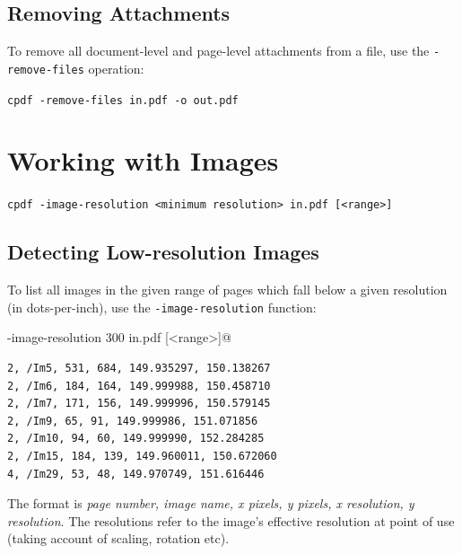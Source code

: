 \documentclass[a4paper,makeidx]{memoir}
\begin{document}
  \section{Removing Attachments}
   To remove all document-level and page-level attachments from a file, use the \texttt{-remove-files} operation:
  \begin{framed}
    \small\verb!cpdf -remove-files in.pdf -o out.pdf!
  \end{framed}

\chapter{Working with Images}
\begin{framed}
\noindent\small\verb!cpdf -image-resolution <minimum resolution> in.pdf [<range>]!

\end{framed}
  \section{Detecting Low-resolution Images}
  To list all images in the given range of pages which fall below a given resolution (in dots-per-inch), use the \verb!-image-resolution! function:
  \begin{framed}
  \noindent\small\verb@cpdf -image-resolution 300 in.pdf [<range>]@
  \end{framed}

  \begin{framed}
\begin{verbatim}2, /Im5, 531, 684, 149.935297, 150.138267
2, /Im6, 184, 164, 149.999988, 150.458710
2, /Im7, 171, 156, 149.999996, 150.579145
2, /Im9, 65, 91, 149.999986, 151.071856
2, /Im10, 94, 60, 149.999990, 152.284285
2, /Im15, 184, 139, 149.960011, 150.672060
4, /Im29, 53, 48, 149.970749, 151.616446\end{verbatim}
  \end{framed}
  \noindent The format is \textit{page number, image name, x pixels, y pixels, x resolution, y resolution}. The resolutions refer to the image's effective resolution at point of use (taking account of scaling, rotation etc).
\end{document}
